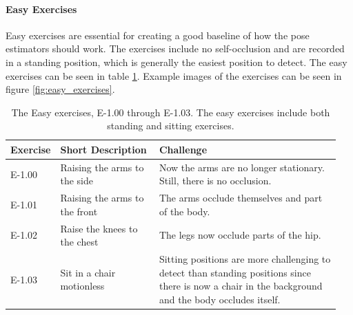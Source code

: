 \paragraph{Easy Exercises}

Easy exercises are essential for creating a good baseline of how the pose estimators should work. The exercises include no self-occlusion and are recorded in a standing position, which is generally the easiest position to detect. The easy exercises can be seen in table \ref{tab:easy_exercises}. Example images of the exercises can be seen in figure \ref{fig:easy_exercises}.

\begin{table}[htb]
  \caption[Easy Exercises]{The Easy exercises, E-1.00 through E-1.03. The easy exercises include both standing and sitting exercises.}
  \label{tab:easy_exercises}
  \begin{tabular}{p{0.1\linewidth}p{0.3\linewidth}p{0.55\linewidth}}
  \hline
  \textbf{Exercise}& \textbf{Short Description}             & \textbf{Challenge} \\ \hline
  E-1.00   & Raising the arms to the side  & Now the arms are no longer stationary. Still, there is no occlusion. \\
  E-1.01   & Raising the arms to the front & The arms occlude themselves and part of the body.  \\
  E-1.02   & Raise the knees to the chest  & The legs now occlude parts of the hip.  \\
  E-1.03   & Sit in a chair motionless     & Sitting positions are more challenging to detect than standing positions since there is now a chair in the background and the body occludes itself.\\ \hline
  \end{tabular}
  \end{table}

